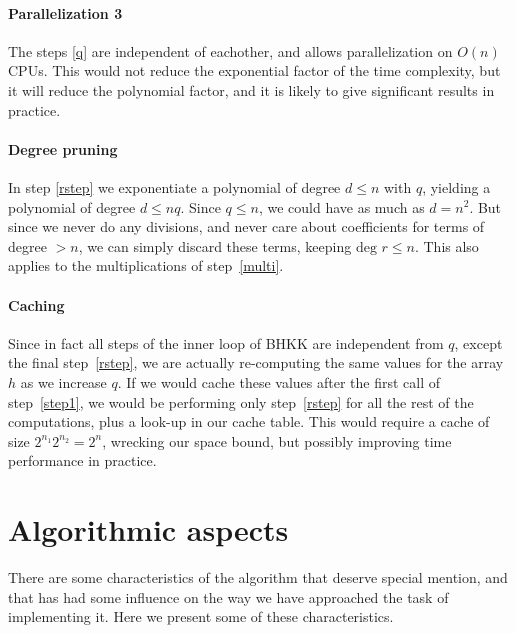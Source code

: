 \documentclass{cslthse-msc}
\begin{document}
\paragraph{Parallelization 3} The steps \ref{q} are independent of eachother, and allows parallelization on $O(n)$ CPUs. This would not reduce the exponential factor of the time complexity, but it will reduce the polynomial factor, and it is likely to give significant results in practice.

\paragraph{Degree pruning} In step \ref{rstep} we exponentiate a polynomial of degree $d \leq n$ with $q$, yielding a polynomial of degree $d \leq nq$. Since $q \leq n$, we could have as much as $d = n^2$. But since we never do any divisions, and never care about coefficients for terms of degree $> n$, we can simply discard these terms, keeping $\text{deg } r \leq n$. This also applies to the multiplications of step~\ref{multi}.

\paragraph{Caching} Since in fact all steps of the inner loop of BHKK are independent from $q$, except the final step~\ref{rstep}, we are actually re-computing the same values for the array $h$ as we increase $q$. If we would cache these values after the first call of step~\ref{step1}, we would be performing only step~\ref{rstep} for all the rest of the computations, plus a look-up in our cache table. This would require a cache of size $2^{n_1} 2^{n_2} = 2^n$, wrecking our space bound, but possibly improving time performance in practice.


\section{Algorithmic aspects}
There are some characteristics of the algorithm that deserve special mention, and that has had some influence on the way we have approached the task of implementing it. Here we present some of these characteristics.
\end{document}
